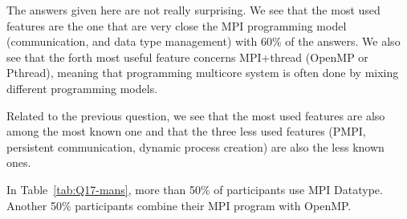 The answers given here are not really surprising. We see that the most used
features are the one that are very close the MPI programming model
(communication, and data type management) with 60\% of the answers. We also see
that the forth most useful feature concerns MPI+thread (OpenMP or Pthread),
meaning that programming multicore system is often done by mixing different
programming models.  

Related to the previous question, we see that the most used features are also
among the most known one and that the three less used features (PMPI, persistent
communication, dynamic process creation) are also the less known
ones. 

In Table~\ref{tab:Q17-mans}, more than 50\% of participants use MPI
Datatype. Another 50\% participants combine their MPI program with
OpenMP. 
